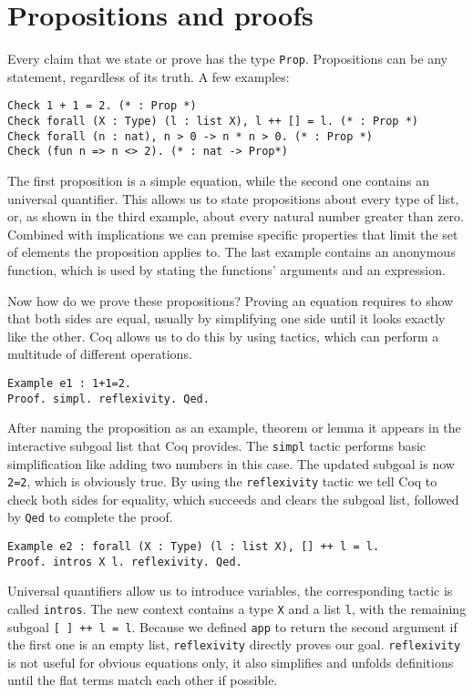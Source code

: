 \documentclass[fleqn]{scrreprt}
\newcommand{\todo}[1]{\marginpar{\textbf{TODO:} #1}}
\newcommand{\coqinline}[1]{\texttt{#1}}
\begin{document}
\section{Propositions and proofs}
Every claim that we state or prove has the type \coqinline{Prop}. Propositions can be any statement, regardless of its truth. A few examples:
\begin{verbatim}
Check 1 + 1 = 2. (* : Prop *)
Check forall (X : Type) (l : list X), l ++ [] = l. (* : Prop *)
Check forall (n : nat), n > 0 -> n * n > 0. (* : Prop *)
Check (fun n => n <> 2). (* : nat -> Prop*)
\end{verbatim}
The first proposition is a simple equation, while the second one contains an universal quantifier. This allows us to state propositions about every type of list, or, as shown in the third example, about every natural number greater than zero. Combined with implications we can premise specific properties that limit the set of elements the proposition applies to. The last example contains an anonymous function, which is used by stating the functions' arguments and an expression.
\par
Now how do we prove these propositions? Proving an equation requires to show that both sides are equal, usually by simplifying one side until it looks exactly like the other. Coq allows us to do this by using tactics, which can perform a multitude of different operations.
\begin{verbatim}
Example e1 : 1+1=2.
Proof. simpl. reflexivity. Qed. 
\end{verbatim} 
\todo{Highlighting für Proof und Qed}
After naming the proposition as an example, theorem or lemma it appears in the interactive subgoal list that Coq provides. The \coqinline{simpl} tactic performs basic simplification like adding two numbers in this case. The updated subgoal is now \coqinline{2=2}, which is obviously true. By using the \coqinline{reflexivity} tactic we tell Coq to check both sides for equality, which succeeds and clears the subgoal list, followed by \coqinline{Qed} to complete the proof.
\begin{verbatim}
Example e2 : forall (X : Type) (l : list X), [] ++ l = l.
Proof. intros X l. reflexivity. Qed.
\end{verbatim}
Universal quantifiers allow us to introduce variables, the corresponding tactic is called \coqinline{intros}. The new context contains a type \coqinline{X} and a list \coqinline{l}, with the remaining subgoal \coqinline{[ ] ++ l = l}. Because we defined \coqinline{app} to return the second argument if the first one is an empty list, \coqinline{reflexivity} directly proves our goal. \coqinline{reflexivity} is not useful for obvious equations only, it also simplifies and unfolds definitions until the flat terms match each other if possible.
\end{document}
